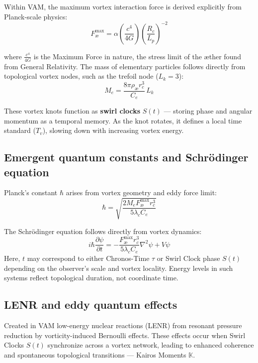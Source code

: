 Within VAM, the maximum vortex interaction force is derived explicitly from Planck-scale physics:
\begin{equation}
    F^{\text{max}}_{\text{\ae}} = \alpha  \left(\frac{c^4}{4G}\right) \left(\frac{R_c}{L_p}\right)^{-2}
\end{equation}

where $\frac{c^4}{4G}$ is the Maximum Force in nature, the stress limit of the æther found from General Relativity.
The mass of elementary particles follows directly from topological vortex nodes, such as the trefoil node ($L_k=3$):
\begin{equation}
    M_e = \frac{8\pi \rho_\text{\ae} r_c^3}{C_e}\, L_k
\end{equation}

These vortex knots function as \textbf{swirl clocks} $S(t)$ — storing phase and angular momentum as a temporal memory. As the knot rotates, it defines a local time standard ($T_v$), slowing down with increasing vortex energy.


\subsection*{Emergent quantum constants and Schrödinger equation}

Planck's constant $\hbar$ arises from vortex geometry and eddy force limit:
\begin{equation}
    \hbar = \sqrt{\frac{2 M_e F^{\text{max}}_{\text{\ae}} r_c^3}{5 \lambda_c C_e}}
\end{equation}

The Schrödinger equation follows directly from vortex dynamics:
\begin{equation}
    i \hbar \frac{\partial \psi}{\partial t} = -\frac{F^{\text{max}}_{\text{\ae}} r_c^3}{5 \lambda_c C_e}\nabla^2 \psi + V\psi
\end{equation}
Here, $t$ may correspond to either Chronos-Time $\tau$ or Swirl Clock phase $S(t)$ depending on the observer's scale and vortex locality. Energy levels in such systems reflect topological duration, not coordinate time.


\subsection*{LENR and eddy quantum effects}

Created in VAM low-energy nuclear reactions (LENR) from resonant pressure reduction by vorticity-induced Bernoulli effects. These effects occur when Swirl Clocks $S(t)$ synchronize across a vortex network, leading to enhanced coherence and spontaneous topological transitions — Kairos Moments $\mathbb{K}$.

